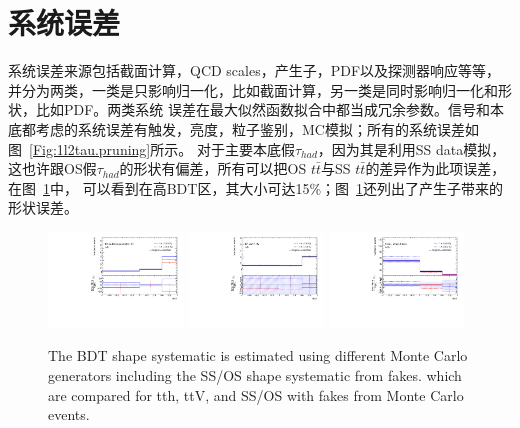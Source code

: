 \section{系统误差}\label{sec:1l2tau_sys}
\ltwotau 系统误差来源包括截面计算，QCD scales，产生子，PDF以及探测器响应等等，并分为两类，一类是只影响归一化，比如截面计算，另一类是同时影响归一化和形状，比如PDF。两类系统
误差在最大似然函数拟合中都当成冗余参数。信号和本底都考虑的系统误差有触发，亮度，粒子鉴别，MC模拟；所有的系统误差如图~\ref{Fig:1l2tau.pruning}所示。
对于主要本底假$\tau_{had}$，因为其是利用SS data模拟，这也许跟OS假$\tau_{had}$的形状有偏差，所有可以把OS $t\bar{t}$与SS $t\bar{t}$的差异作为此项误差，在图~\ref{Fig:1l2tau.shapesys}中，
可以看到在高BDT区，其大小可达15\%；图~\ref{Fig:1l2tau.shapesys}还列出了产生子带来的形状误差。
\begin{figure}[htbp]
\centering
\begin{center}
  \includegraphics[width=0.32\textwidth, angle=-90, keepaspectratio]{fig/OneLepTwoTaus/Plots_tth-signal_MCsys.pdf}
  \includegraphics[width=0.32\textwidth, angle=-90, keepaspectratio]{fig/OneLepTwoTaus/Plots_ttV-signal_MCsys.pdf}
  \includegraphics[width=0.32\textwidth, angle=-90, keepaspectratio]{fig/OneLepTwoTaus/h1l2tau_Fakes.pdf}
\end{center}
\caption{The BDT shape systematic is estimated using different Monte Carlo generators including the SS/OS shape systematic from fakes. 
which are compared for tth, ttV, and SS/OS with fakes from Monte Carlo events.
}
\label{Fig:1l2tau.shapesys}
\end{figure}
